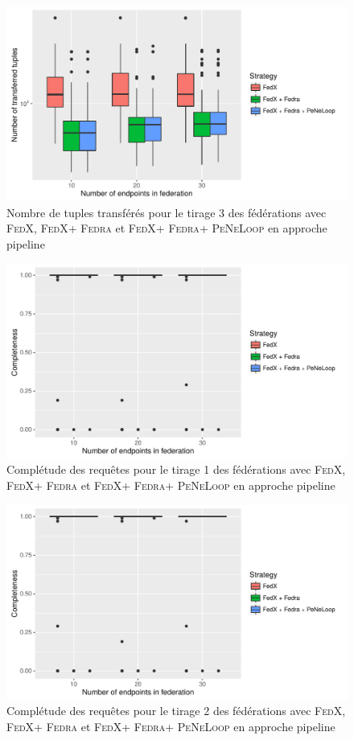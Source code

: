 \documentclass[a4paper]{article}
\def\fedra{\textsc{Fedra}\xspace}
\def\fedx{\textsc{FedX}\xspace}
\def\peneloop{\textsc{PeNeLoop}\xspace}
\begin{document}
\begin{figure}[h]
    \centering
    \includegraphics{boxplots/fed3_transferred_tuples.pdf}
    \caption{Nombre de tuples transférés pour le tirage 3 des fédérations avec \fedx, \fedx + \fedra et \fedx + \fedra + \peneloop en approche pipeline}
    \label{fig:fed3_tuples}
\end{figure}

\begin{figure}[h]
    \centering
    \includegraphics{boxplots/fed1_completeness.pdf}
    \caption{Complétude des requêtes pour le tirage 1 des fédérations avec \fedx, \fedx + \fedra et \fedx + \fedra + \peneloop en approche pipeline}
    \label{fig:fed1_compl}
\end{figure}

\begin{figure}[h]
    \centering
    \includegraphics{boxplots/fed2_completeness.pdf}
    \caption{Complétude des requêtes pour le tirage 2 des fédérations avec \fedx, \fedx + \fedra et \fedx + \fedra + \peneloop en approche pipeline}
    \label{fig:fed2_compl}
\end{figure}
\end{document}
